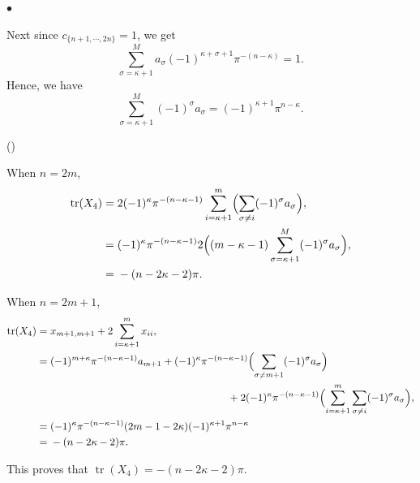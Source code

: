 \documentclass[pdflatex,sn-mathphys-num]{sn-jnl}%
\theoremstyle{thmstyleone}%
\theoremstyle{thmstyletwo}%
\numberwithin{equation}{subsection}
\theoremstyle{thmstylethree}%
\DeclareMathOperator{\tr}{tr}
\newenvironment{altenumerate}
	{\begin{list}
			{(\theenumi) }
			{\usecounter{enumi}
				\setlength{\labelwidth}{0pt}
				\setlength{\labelsep}{0pt}
				\setlength{\leftmargin}{0pt}
				\setlength{\itemsep}{\the\smallskipamount}
				\renewcommand{\theenumi}{\roman{enumi}}
		}}
		{\end{list}}
\newenvironment{altitemize}
	{\begin{list}
			{$\bullet$}
			{\setlength{\labelwidth}{0pt}
				\setlength{\itemindent}{5pt}
				\setlength{\labelsep}{5pt}
				\setlength{\leftmargin}{0pt}
				\setlength{\itemsep}{\the\smallskipamount}
		}}
		{\end{list}}
\begin{document}
\begin{altitemize}
\item
Next since $c_{\{n+1,\cdots,2n\}}=1$, we get
\begin{equation*}
\sum_{\sigma=\kappa+1}^M a_\sigma (-1)^{\kappa+\sigma+1} \pi^{-(n-\kappa)}=1.
\end{equation*}
Hence, we have
\begin{equation*}
\sum_{\sigma=\kappa+1}^M (-1)^\sigma a_\sigma=(-1)^{\kappa+1}\pi^{n-\kappa}.
\end{equation*}

\begin{altenumerate}
\item When $n=2m$,
\begin{align*}
\tr(X_4)={}	&	2(-1)^{\kappa}\pi^{-(n-\kappa-1)}\sum_{i=\kappa+1}^m \Bigl(\sum_{\sigma\neq i}(-1)^\sigma a_\sigma\Bigr),\\
={}&(-1)^\kappa\pi^{-(n-\kappa-1)}2\Bigl((m-\kappa-1)\sum_{\sigma=\kappa+1}^M (-1)^\sigma a_\sigma\Bigr),\\
={}	&	-(n-2\kappa-2)\pi.
\end{align*}
\item When $n=2m+1$,
\begin{align*}
\tr(X_4)={}	&	x_{m+1,m+1}+2\sum_{i=\kappa+1}^m x_{ii},\\
={}	&	(-1)^{m+\kappa}\pi^{-(n-\kappa-1)}a_{m+1}+(-1)^{\kappa}\pi^{-(n-\kappa-1)}\Bigl(\sum_{\sigma\neq m+1}(-1)^\sigma a_\sigma\Bigr)\\
&\hspace{6cm}+2(-1)^\kappa\pi^{-(n-\kappa-1)}\Bigl(\sum_{i=\kappa+1}^m\sum_{\sigma\neq i}(-1)^\sigma a_\sigma\Bigr),\\
={}	&	(-1)^\kappa\pi^{-(n-\kappa-1)}(2m-1-2\kappa)(-1)^{\kappa+1}\pi^{n-\kappa}\\
={}	&	-(n-2\kappa-2)\pi.
\end{align*}
\end{altenumerate}
This proves that $\tr(X_4)=-(n-2\kappa-2)\pi.$
				

\end{altitemize}
\end{document}
